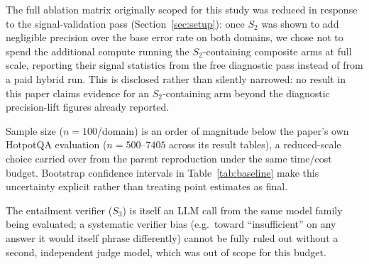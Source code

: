 The full ablation matrix originally scoped for this study was reduced in
response to the signal-validation pass (Section~\ref{sec:setup}): once
$S_2$ was shown to add negligible precision over the base error rate on
both domains, we chose not to spend the additional compute running the
$S_2$-containing composite arms at full scale, reporting their signal
statistics from the free diagnostic pass instead of from a paid hybrid
run. This is disclosed rather than silently narrowed: no result in this
paper claims evidence for an $S_2$-containing arm beyond the diagnostic
precision-lift figures already reported.

Sample size ($n{=}100$/domain) is an order of magnitude below the paper's
own HotpotQA evaluation ($n{=}500$--$7405$ across its result tables), a
reduced-scale choice carried over from the parent reproduction under the
same time/cost budget. Bootstrap confidence intervals in
Table~\ref{tab:baseline} make this uncertainty explicit rather than
treating point estimates as final.

The entailment verifier ($S_3$) is itself an LLM call from the same
model family being evaluated; a systematic verifier bias (e.g.\ toward
``insufficient'' on any answer it would itself phrase differently) cannot
be fully ruled out without a second, independent judge model, which was
out of scope for this budget.
